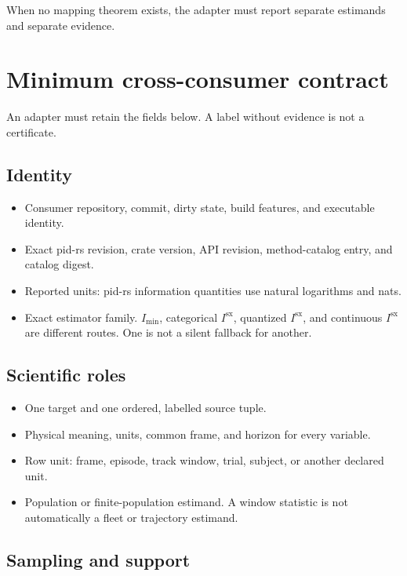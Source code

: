 \documentclass[11pt]{article}
\newcommand{\Sx}{I^{\mathrm{sx}}}
\newcommand{\Imin}{I_{\min}}
\begin{document}
When no mapping theorem exists, the adapter must report separate estimands and
separate evidence.

\section{Minimum cross-consumer contract}

An adapter must retain the fields below.  A label without evidence is not a
certificate.

\subsection{Identity}

\begin{itemize}
\item Consumer repository, commit, dirty state, build features, and executable identity.
\item Exact pid-rs revision, crate version, API revision, method-catalog entry, and catalog digest.
\item Reported units: pid-rs information quantities use natural logarithms and nats.
\item Exact estimator family.  $\Imin$, categorical $\Sx$, quantized $\Sx$, and continuous $\Sx$ are different routes.  One is not a silent fallback for another.
\end{itemize}

\subsection{Scientific roles}

\begin{itemize}
\item One target and one ordered, labelled source tuple.
\item Physical meaning, units, common frame, and horizon for every variable.
\item Row unit: frame, episode, track window, trial, subject, or another declared unit.
\item Population or finite-population estimand.  A window statistic is not automatically a fleet or trajectory estimand.
\end{itemize}

\subsection{Sampling and support}
\end{document}
